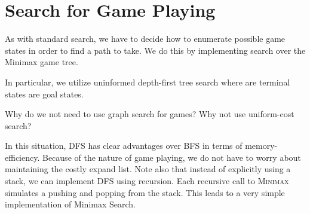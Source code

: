 \documentclass[11pt]{article}
\begin{document}
\section{Search for Game Playing}

As with standard search, we have to decide how to 
enumerate possible game states in order to find a path to take. We do this by implementing search over the Minimax game tree. 

In particular, we utilize uninformed depth-first tree search where are terminal states are goal states. 
\begin{exercise}
  Why do we not need to use graph search for games? Why not use uniform-cost search?
\end{exercise}

\censor{}


In this situation, DFS has clear advantages over BFS in terms of memory-efficiency. Because of the nature of game playing, we do not have to worry about maintaining the costly expand list. 
Note also that instead of explicitly using a stack, we can implement DFS using recursion. Each recursive call to \textsc{Minimax} simulates a pushing and popping from the stack. This leads to a very simple implementation of Minimax Search. 
\air


\begin{algorithm}[h]
\begin{algorithmic}[1]

  \EndFor{}
  \EndFor{}
  \EndIf{}
  \EndProcedure{}
\end{algorithmic}
\end{algorithm}


\end{document}

